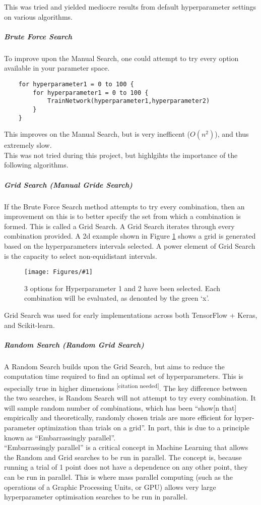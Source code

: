 \documentclass{UoNMCHA}
\newcommand{\citationneeded}{\textsuperscript{\color{blue} [citation needed]}}
\newcommand{\inlineQuote}[1]{``#1''}
\newcommand{\fref}[1] {Figure \ref{#1}}
\newcommand{\fFigure}[3]{
	\begin{figure}[h]
        \begin{center}  
            \texttt{[image: Figures/\#1]}  
            \caption{#2}
            \label{#1}
        \end{center}
	\end{figure}
}
\numberwithin{equation}{section}
\begin{document}
This was tried and yielded mediocre results from default hyperparameter settings on various algorithms.


 \subparagraph{Brute Force Search}
To improve upon the Manual Search, one could attempt to try every option available in your parameter space.

\begin{lstlisting}
    for hyperparameter1 = 0 to 100 {
        for hyperparameter1 = 0 to 100 {
            TrainNetwork(hyperparameter1,hyperparameter2)
        }
    }
\end{lstlisting}
This improves on the Manual Search, but is very inefficent ($O(n^2)$), and thus extremely slow. \\

This was not tried during this project, but highlgihts the importance of the following algorithms.

\subparagraph{Grid Search (Manual Gride Search)}
If the Brute Force Search method attempts to try every combination, then an improvement on this is to better specify the set from which a combination is formed. This is called a Grid Search. A Grid Search iterates through every combination provided. A 2d example shown in \fref{gridsearch.png} shows a grid is generated based on the hyperparameters intervals selected. A power element of Grid Search is the capacity to select non-equidistant intervals. \\

\fFigure{gridsearch.png}{3 options for Hyperparameter 1 and 2 have been selected. Each combination will be evaluated, as denonted by the green `x'.}{0.5} 

Grid Search was used for early implementations across both TensorFlow + Keras, and Scikit-learn.

\subparagraph{Random Search (Random Grid Search)}
A Random Search builds upon the Grid Search, but aims to reduce the computation time required to find an optimal set of hyperparameters. This is especially true in higher dimensions\citationneeded. The key difference between the two searches, is Random Search will not attempt to try every combination. It will sample random number of combinations, which has been \inlineQuote{show[n that] empirically and theoretically, randomly chosen trials are more efficient for hyper-parameter optimization than trials on a grid}\cite{bergstra2012random}. In part, this is due to a principle known as \inlineQuote{Embarrassingly parallel}.\\
\inlineQuote{Embarrassingly parallel}\cite{MauriceHerlihy2012} is a critical concept in Machine Learning that allows the Random and Grid searches to be run in parallel. The concept is, because running a trial of 1 point does not have a dependence on any other point, they can be run in parallel. This is where mass parallel computing (such as the operations of a Graphic Processing Units, or GPU) allows very large hyperparameter optimisation searches to be run in parallel. \\
\end{document}
